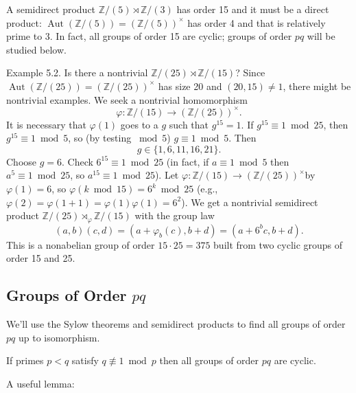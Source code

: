 \begin{example}
A semidirect product $\mathbb{Z} /(5) \rtimes \mathbb{Z} /(3)$ has order 15 and it must be a direct product: $\operatorname{Aut}(\mathbb{Z} /(5))=(\mathbb{Z} /(5))^{\times}$ has order 4 and that is relatively prime to 3. In fact, all groups of order 15 are cyclic; groups of order $p q$ will be studied below.
\end{example}
\begin{example}
Example 5.2. Is there a nontrivial $\mathbb{Z} /(25) \rtimes \mathbb{Z} /(15)$? Since $\operatorname{Aut}(\mathbb{Z} /(25))=(\mathbb{Z} /(25))^{\times}$ has size 20 and $(20,15) \neq 1$, there might be nontrivial examples. We seek a nontrivial homomorphism
\[
\varphi: \mathbb{Z} /(15) \rightarrow(\mathbb{Z} /(25))^{\times} .
\]It is necessary that $\varphi(1)$ goes to a $g$ such that $g^{15}=1$. If $g^{15} \equiv 1 \bmod 25$, then $g^{15} \equiv 1 \bmod 5$, so (by testing $\bmod 5$) $g \equiv 1 \bmod 5$. Then
\[
g \in\{1,6,11,16,21\} .
\]Choose $g=6$. Check $6^{15} \equiv 1 \bmod 25$ (in fact, if $a \equiv 1 \bmod 5$ then $a^5 \equiv 1 \bmod 25$, so $a^{15} \equiv 1 \bmod 25$). Let $\varphi: \mathbb{Z} /(15) \rightarrow(\mathbb{Z} /(25))^{\times}$by $\varphi(1)=6$, so $\varphi(k \bmod 15)=6^k \bmod 25$ (e.g., $\varphi(2)=\varphi(1+1)=\varphi(1) \varphi(1)=6^2$). We get a nontrivial semidirect product $\mathbb{Z} /(25) \rtimes_{\varphi} \mathbb{Z} /(15)$ with the group law
\[
(a, b)(c, d)=\left(a+\varphi_b(c), b+d\right)=\left(a+6^b c, b+d\right) .
\]This is a nonabelian group of order $15 \cdot 25=375$ built from two cyclic groups of order 15 and 25.
\end{example}
\subsection{Groups of Order \texorpdfstring{$pq$}{pq}}

We'll use the Sylow theorems and semidirect products to find all groups of order $pq$ up to isomorphism.

\begin{theorem}[Theorem 6.1]
If primes $p<q$ satisfy $q \not \equiv 1 \bmod p$ then all groups of order $pq$ are cyclic.
\end{theorem}
A useful lemma:

